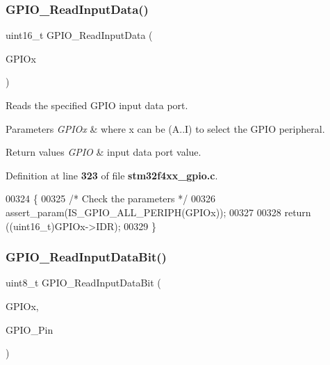 \subsubsection{G\+P\+I\+O\+\_\+\+Read\+Input\+Data()}
{\footnotesize\ttfamily uint16\+\_\+t G\+P\+I\+O\+\_\+\+Read\+Input\+Data (\begin{DoxyParamCaption}\item[{\textbf{ G\+P\+I\+O\+\_\+\+Type\+Def} $\ast$}]{G\+P\+I\+Ox }\end{DoxyParamCaption})}



Reads the specified G\+P\+IO input data port. 


\begin{DoxyParams}{Parameters}
{\em G\+P\+I\+Ox} & where x can be (A..I) to select the G\+P\+IO peripheral. \\
\hline
\end{DoxyParams}

\begin{DoxyRetVals}{Return values}
{\em G\+P\+IO} & input data port value. \\
\hline
\end{DoxyRetVals}


Definition at line \textbf{ 323} of file \textbf{ stm32f4xx\+\_\+gpio.\+c}.


\begin{DoxyCode}
00324 \{
00325   \textcolor{comment}{/* Check the parameters */}
00326   assert_param(IS_GPIO_ALL_PERIPH(GPIOx));
00327 
00328   \textcolor{keywordflow}{return} ((uint16\_t)GPIOx->IDR);
00329 \}
\end{DoxyCode}
\mbox{\label{group__GPIO__Group2_ga98772ef6b639b3fa06c8ae5ba28d3aaa}} 
\subsubsection{G\+P\+I\+O\+\_\+\+Read\+Input\+Data\+Bit()}
{\footnotesize\ttfamily uint8\+\_\+t G\+P\+I\+O\+\_\+\+Read\+Input\+Data\+Bit (\begin{DoxyParamCaption}\item[{\textbf{ G\+P\+I\+O\+\_\+\+Type\+Def} $\ast$}]{G\+P\+I\+Ox,  }\item[{uint16\+\_\+t}]{G\+P\+I\+O\+\_\+\+Pin }\end{DoxyParamCaption})}




